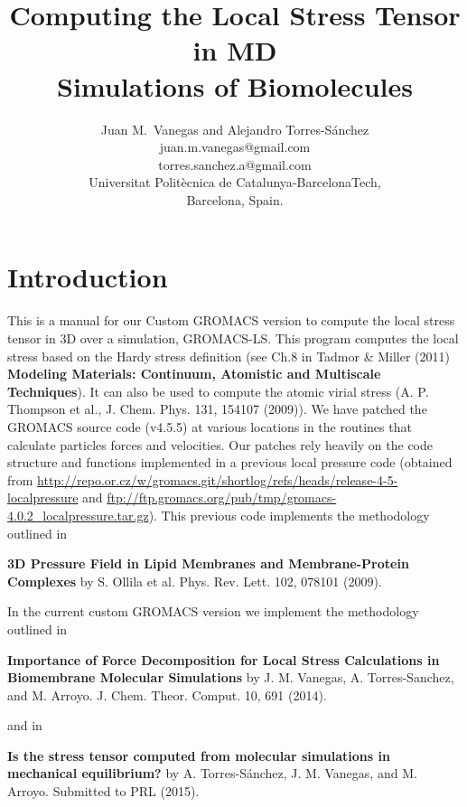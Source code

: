 \documentclass[10pt,letterpaper,notitlepage]{article}
\begin{document}
\title{Computing the Local Stress Tensor in MD \\Simulations of Biomolecules}
\author{Juan M.~Vanegas and Alejandro Torres-S\'anchez
\\juan.m.vanegas@gmail.com
\\torres.sanchez.a@gmail.com
\\Universitat Polit\`ecnica de Catalunya-BarcelonaTech, \\Barcelona, Spain.}
\maketitle

\section{Introduction}
This is a manual for our Custom GROMACS version to compute the local stress tensor in 3D over a simulation, GROMACS-LS. This program computes the local stress based on the Hardy stress definition (see Ch.8 in Tadmor \& Miller (2011) {\bf Modeling Materials: Continuum, Atomistic and Multiscale Techniques}). It can also be used to compute the atomic virial stress (A. P. Thompson et al., J. Chem. Phys. 131, 154107 (2009)). We have patched the GROMACS source code (v4.5.5) at various locations in the routines that calculate particles forces and velocities. Our patches rely heavily on the code structure and functions implemented in a previous local pressure code (obtained from \url{http://repo.or.cz/w/gromacs.git/shortlog/refs/heads/release-4-5-localpressure} and \url{ftp://ftp.gromacs.org/pub/tmp/gromacs-4.0.2_localpressure.tar.gz}). This previous code implements the methodology outlined in

{\bf 3D Pressure Field in Lipid Membranes and Membrane-Protein Complexes} by S. Ollila et al. Phys. Rev. Lett. 102, 078101 (2009). 

In the current custom GROMACS version we implement the methodology outlined in

{\bf Importance of Force Decomposition for Local Stress Calculations in Biomembrane Molecular Simulations} by J. M. Vanegas, A. Torres-Sanchez, and M. Arroyo. J. Chem. Theor. Comput.  10, 691 (2014). 

and in

{\bf Is the stress tensor computed from molecular simulations in mechanical equilibrium?} by  A. Torres-S\'anchez, J. M. Vanegas, and M. Arroyo. Submitted to PRL (2015).
\end{document}
